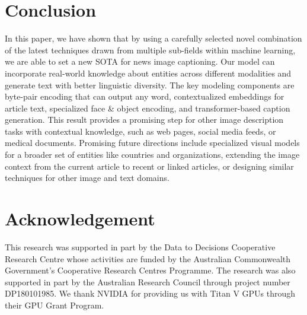 
\secmoveup
\section{Conclusion}
In this paper, we have shown that by using a carefully selected novel
combination of the latest techniques drawn from multiple sub-fields within
machine learning, we are able to set a new SOTA for news image captioning. Our
model can incorporate real-world knowledge about entities across different
modalities and generate text with better linguistic diversity. The key modeling
components are byte-pair encoding that can output any word, contextualized
embeddings for article text, specialized face \& object encoding, and
transformer-based caption generation. This result provides a promising step for
other image description tasks with contextual knowledge, such as web pages,
social media feeds, or medical documents. Promising future directions include
specialized visual models for a broader set of entities like countries and
organizations, extending the image context from the current article to recent
or linked articles, or designing similar techniques for other image and text
domains.

\secmoveup
\section*{Acknowledgement}

This research was supported in part by the Data to Decisions Cooperative
Research Centre whose activities are funded by the Australian Commonwealth
Government’s Cooperative Research Centres Programme. The research was also
supported in part by the Australian Research Council through project number
DP180101985. We thank NVIDIA for providing us with Titan V GPUs through their
GPU Grant Program.


